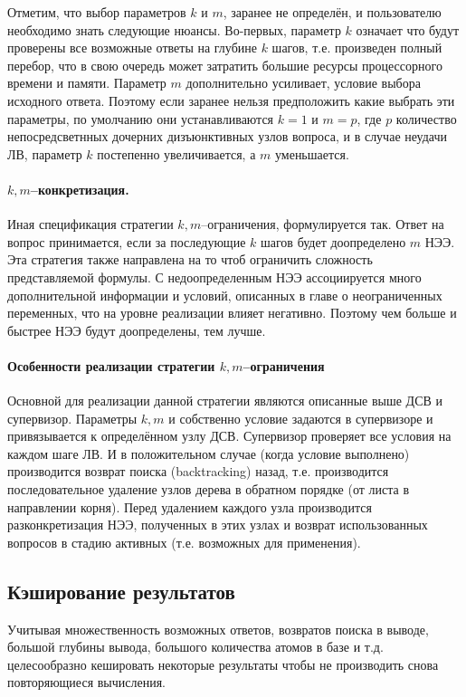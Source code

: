 Отметим, что выбор параметров $k$ и $m$, заранее не определён, и пользователю необходимо знать следующие нюансы. Во-первых, параметр $k$ означает что будут проверены все возможные ответы на глубине $k$ шагов, т.е. произведен полный перебор, что в свою очередь может затратить большие ресурсы процессорного времени и памяти. Параметр $m$ дополнительно усиливает, условие выбора исходного ответа. Поэтому если заранее нельзя предположить какие выбрать эти параметры, по умолчанию они устанавливаются $k=1$ и $m=p$, где $p$ количество непосредсветнных дочерних дизъюнктивных узлов вопроса, и в случае неудачи ЛВ, параметр $k$ постепенно увеличивается, а $m$ уменьшается.

\paragraph{$k,m$--конкретизация.} Иная спецификация стратегии $k,m$--ограничения, формулируется так. Ответ на вопрос принимается, если за последующие $k$ шагов будет доопределено $m$ НЭЭ. Эта стратегия также направлена на то чтоб ограничить сложность представляемой формулы. С недоопределенным НЭЭ ассоциируется много дополнительной информации и условий, описанных в главе о неограниченных переменных, что на уровне реализации влияет негативно. Поэтому чем больше и быстрее НЭЭ будут доопределены, тем лучше. 

\paragraph{Особенности реализации стратегии $k,m$--ограничения}
Основной для реализации данной стратегии являются описанные выше ДСВ и супервизор. Параметры $k,m$ и собственно условие задаются в супервизоре и привязывается к определённом узлу ДСВ. Супервизор проверяет все условия на каждом шаге ЛВ. И в положительном случае (когда условие выполнено) производится возврат поиска (backtracking) назад, т.е. производится последовательное удаление узлов дерева в обратном порядке (от листа в направлении корня). Перед удалением каждого узла производится разконкретизация НЭЭ, полученных в этих узлах и возврат использованных вопросов в стадию активных (т.е. возможных для применения).

\subsection{Кэширование результатов}
Учитывая множественность возможных ответов, возвратов поиска в выводе, большой глубины вывода, большого количества атомов в базе и т.д. целесообразно кешировать некоторые результаты чтобы не производить снова повторяющиеся вычисления.

